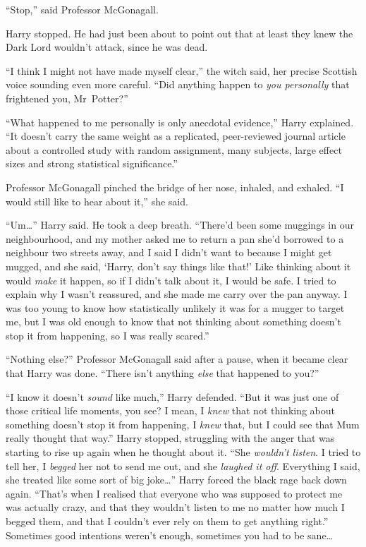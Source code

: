 “Stop,” said Professor McGonagall.

Harry stopped. He had just been about to point out that at least they knew the Dark Lord wouldn’t attack, since he was dead.

“I think I might not have made myself clear,” the witch said, her precise Scottish voice sounding even more careful. “Did anything happen to \emph{you personally} that frightened you, Mr~Potter?”

“What happened to me personally is only anecdotal evidence,” Harry explained. “It doesn’t carry the same weight as a replicated, peer-reviewed journal article about a controlled study with random assignment, many subjects, large effect sizes and strong statistical significance.”

Professor McGonagall pinched the bridge of her nose, inhaled, and exhaled. “I would still like to hear about it,” she said.

“Um…” Harry said. He took a deep breath. “There’d been some muggings in our neighbourhood, and my mother asked me to return a pan she’d borrowed to a neighbour two streets away, and I said I didn’t want to because I might get mugged, and she said, ‘Harry, don’t say things like that!’ Like thinking about it would \emph{make} it happen, so if I didn’t talk about it, I would be safe. I tried to explain why I wasn’t reassured, and she made me carry over the pan anyway. I was too young to know how statistically unlikely it was for a mugger to target me, but I was old enough to know that not thinking about something doesn’t stop it from happening, so I was really scared.”

“Nothing else?” Professor McGonagall said after a pause, when it became clear that Harry was done. “There isn’t anything \emph{else} that happened to you?”

“I know it doesn’t \emph{sound} like much,” Harry defended. “But it was just one of those critical life moments, you see? I mean, I \emph{knew} that not thinking about something doesn’t stop it from happening, I \emph{knew} that, but I could see that Mum really thought that way.” Harry stopped, struggling with the anger that was starting to rise up again when he thought about it. “She \emph{wouldn’t listen}. I tried to tell her, I \emph{begged} her not to send me out, and she \emph{laughed it off}. Everything I said, she treated like some sort of big joke…” Harry forced the black rage back down again. “That’s when I realised that everyone who was supposed to protect me was actually crazy, and that they wouldn’t listen to me no matter how much I begged them, and that I couldn’t ever rely on them to get anything right.” Sometimes good intentions weren’t enough, sometimes you had to be sane…

